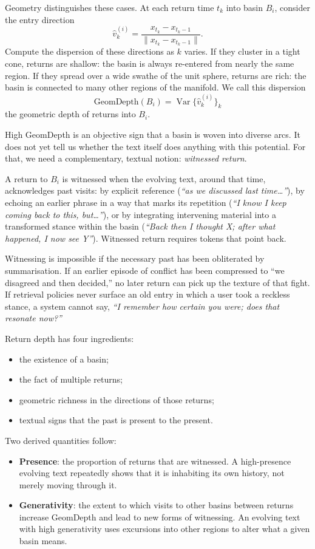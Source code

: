 \documentclass[12pt,a4paper]{report}
\begin{document}
Geometry distinguishes these cases. At each return time $t_k$ into basin $B_i$, consider the entry direction
\[
\hat{v}^{(i)}_{k} = \frac{x_{t_k} - x_{t_k-1}}{\|x_{t_k} - x_{t_k-1}\|}.
\]
Compute the dispersion of these directions as $k$ varies. If they cluster in a tight cone, returns are shallow: the basin is always re-entered from nearly the same region. If they spread over a wide swathe of the unit sphere, returns are rich: the basin is connected to many other regions of the manifold. We call this dispersion
\[
\mathrm{GeomDepth}(B_i) = \operatorname{Var}\bigl\{\hat{v}^{(i)}_{k}\bigr\}_k
\]
the geometric depth of returns into $B_i$.

High GeomDepth is an objective sign that a basin is woven into diverse arcs. It does not yet tell us whether the text itself does anything with this potential. For that, we need a complementary, textual notion: \emph{witnessed return}.

A return to $B_i$ is witnessed when the evolving text, around that time, acknowledges past visits: by explicit reference (\emph{``as we discussed last time\ldots''}), by echoing an earlier phrase in a way that marks its repetition (\emph{``I know I keep coming back to this, but\ldots''}), or by integrating intervening material into a transformed stance within the basin (\emph{``Back then I thought X; after what happened, I now see Y''}). Witnessed return requires tokens that point back.

Witnessing is impossible if the necessary past has been obliterated by summarisation. If an earlier episode of conflict has been compressed to ``we disagreed and then decided,'' no later return can pick up the texture of that fight. If retrieval policies never surface an old entry in which a user took a reckless stance, a system cannot say, \emph{``I remember how certain you were; does that resonate now?''}

Return depth has four ingredients:
\begin{itemize}
  \item the existence of a basin;
  \item the fact of multiple returns;
  \item geometric richness in the directions of those returns;
  \item textual signs that the past is present to the present.
\end{itemize}

Two derived quantities follow:
\begin{itemize}
  \item \textbf{Presence}: the proportion of returns that are witnessed. A high-presence evolving text repeatedly shows that it is inhabiting its own history, not merely moving through it.
  \item \textbf{Generativity}: the extent to which visits to other basins between returns increase GeomDepth and lead to new forms of witnessing. An evolving text with high generativity uses excursions into other regions to alter what a given basin means.
\end{itemize}
\end{document}
